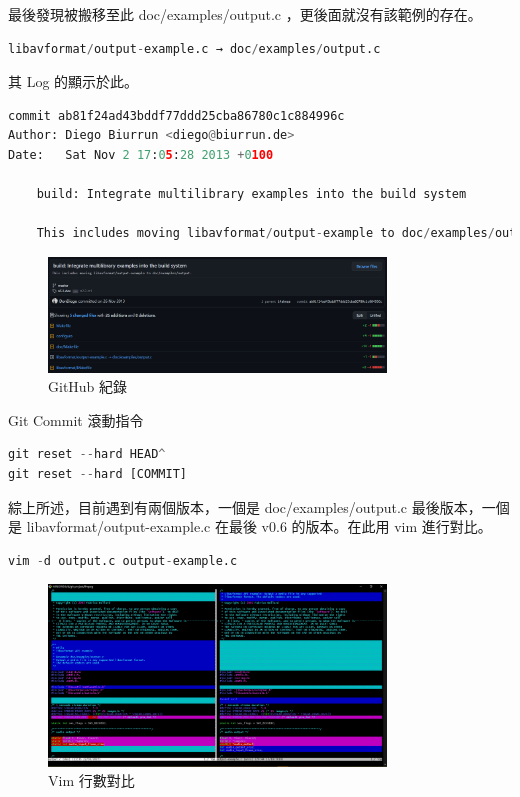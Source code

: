 \documentclass[10pt,UTF8]{ctexart}
\begin{document}
最後發現被搬移至此 doc/examples/output.c ，更後面就沒有該範例的存在。

\begin{lstlisting}[language={python}]
libavformat/output-example.c → doc/examples/output.c
\end{lstlisting}

其 Log 的顯示於此。

\begin{lstlisting}[language={python}]
commit ab81f24ad43bddf77ddd25cba86780c1c884996c
Author: Diego Biurrun <diego@biurrun.de>
Date:   Sat Nov 2 17:05:28 2013 +0100

    build: Integrate multilibrary examples into the build system

    This includes moving libavformat/output-example to doc/examples/output.
\end{lstlisting}

\begin{figure}[H]
\centering 
\includegraphics[width=0.80\textwidth]{g1.png} 
\caption{GitHub 紀錄}
\label{Test}
\end{figure}

Git Commit 滾動指令

\begin{lstlisting}[language={python}]
git reset --hard HEAD^
git reset --hard [COMMIT]
\end{lstlisting}

綜上所述，目前遇到有兩個版本，一個是 doc/examples/output.c 最後版本，一個是 libavformat/output-example.c 在最後 v0.6 的版本。在此用 vim 進行對比。

\begin{lstlisting}[language={python}]
vim -d output.c output-example.c
\end{lstlisting}

\begin{figure}[H]
\centering 
\includegraphics[width=0.80\textwidth]{v1.png} 
\caption{Vim 行數對比}
\label{Test}
\end{figure}
\end{document}
